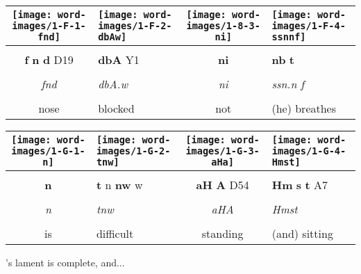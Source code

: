 \vspace{7.5mm}

\begin{tabularx}{\linewidth}{cYcY}
	\texttt{[image: word-images/1-F-1-fnd]} &
	\texttt{[image: word-images/1-F-2-dbAw]} &
	\texttt{[image: word-images/1-8-3-ni]} &
	\texttt{[image: word-images/1-F-4-ssnnf]} \\
	\hline \\ 
	\textbf{f} \textbf{n} \textbf{d} D19 &
	\textbf{dbA} Y1 &
	\textbf{ni} &
	\textbf{nb} \textbf{t} \\
	\hline \\ 
	\textit{fnd} & \textit{dbA.w} & \textit{ni} & \textit{ssn.n f} \\
	\hline \\ 
	nose & blocked & not & (he) breathes
\end{tabularx}

\vspace{7.5mm}

\begin{tabularx}{\linewidth}{cYcY}
	\texttt{[image: word-images/1-G-1-n]} &
	\texttt{[image: word-images/1-G-2-tnw]} &
	\texttt{[image: word-images/1-G-3-aHa]} &
	\texttt{[image: word-images/1-G-4-Hmst]} \\
	\hline \\ 
	\textbf{n} &
	\textbf{t} n \textbf{nw} w &
	\textbf{aH} \textbf{A} D54 &
	\textbf{Hm} \textbf{s} \textbf{t} A7 \\
	\hline \\ 
	\textit{n} & \textit{tnw} & \textit{aHA} & \textit{Hmst} \\
	\hline \\ 
	is & difficult & standing & (and) sitting
\end{tabularx}

\vspace*{\fill}

\pagebreak

\vspace*{\fill}

's lament is complete, and...

\vspace*{\fill}

\pagebreak

\vspace*{\fill}

